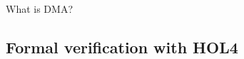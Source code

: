 \documentclass[xcolor={x11names}]{beamer}
\begin{document}
\begin{frame}{What is DMA?}
    \begin{center}
        \begin{figure}
            \label{dma-dangers-1}
        \end{figure}
    \end{center}
\end{frame}


\subsection{Formal verification with HOL4}
\end{document}
